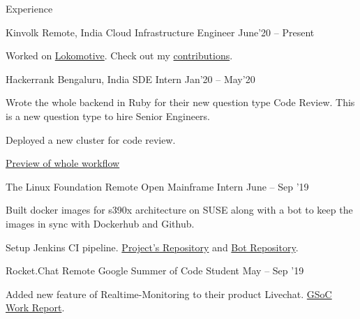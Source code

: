 \documentclass{resume} %
\begin{document}
\begin{rSection}{Experience}

  \begin{rWorkSection}{Kinvolk}
                     {Remote, India}
                     {Cloud Infrastructure Engineer}
                     {June'20 -- Present} {
    \item Worked on \href{https://github.com/kinvolk/lokomotive}{Lokomotive}. Check out my \href{https://bit.ly/3fuHP1L}{contributions}.
  }
  \end{rWorkSection}

  \begin{rWorkSection}{Hackerrank}
                     {Bengaluru, India}
                     {SDE Intern}
                     {Jan'20 -- May'20} {
    \item Wrote the whole backend in Ruby for their new question type Code Review. This is a new question type to hire Senior Engineers. 
    \item Deployed a new cluster for code review.
    \item \href{https://drive.google.com/file/d/1o1cM7VUnvcKaShnM1XLyEChmaIrFrKEh/view}{Preview of whole workflow}
  }
  \end{rWorkSection}

  \begin{rWorkSection}{The Linux Foundation}
                           {Remote}
                           {Open Mainframe Intern}
                           {June -- Sep '19}
  {
    \item Built docker images for s390x architecture on SUSE along with a bot to keep the images in sync with Dockerhub and Github.   
    \item Setup Jenkins CI pipeline. \href{https://github.com/openmainframeproject-internship/DockerHub-Development-Stacks/}{Project's Repository} and \href{https://github.com/knrt10/docker-hub-development-stacks-bot/}{Bot Repository}.  
  }                         
  \end{rWorkSection}

  \begin{rWorkSection}{Rocket.Chat}
                      {Remote}
                      {Google Summer of Code Student}
                      {May -- Sep '19}
  {
    \item Added new feature of Realtime-Monitoring to their product Livechat. \href{http://bit.ly/2kGqWt2}{GSoC Work Report}.
  }
  \end{rWorkSection}


\end{rSection}
\end{document}
